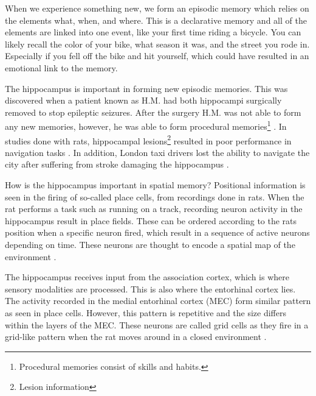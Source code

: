 When we experience something new, we form an episodic memory which relies on the elements what, when, and where. This is a declarative memory and all of the elements are linked into one event, like your first time riding a bicycle. You can likely recall the color of your bike, what season it was, and the street you rode in. Especially if you fell off the bike and hit yourself, which could have resulted in an emotional link to the memory.

The hippocampus is important in forming new episodic memories. This was discovered when a patient known as H.M. had both hippocampi surgically removed to stop epileptic seizures. After the surgery H.M. was not able to form any new memories, however, he was able to form procedural memories\footnote{Procedural memories consist of skills and habits.} \cite{scoville:1957:loss_recent}. In studies done with rats, hippocampal lesions\footnote{Lesion information} resulted in poor performance in navigation tasks \cite{kaada:1961:maze, schlesiger:2013:hippocampal_activation_maze}. In addition, London taxi drivers lost the ability to navigate the city after suffering from stroke damaging the hippocampus \cite{maguire:2000:navigation}.

How is the hippocampus important in spatial memory? Positional information is seen in the firing of so-called place cells, from recordings done in rats. When the rat performs a task such as running on a track, recording neuron activity in the hippocampus result in place fields. These can be ordered according to the rats position when a specific neuron fired, which result in a sequence of active neurons depending on time. These neurons are thought to encode a spatial map of the environment \cite{okeefe:1978:hippocampus}. 

The hippocampus receives input from the association cortex, which is where sensory modalities are processed. This is also where the entorhinal cortex lies. The activity recorded in the medial entorhinal cortex (MEC) form similar pattern as seen in place cells. However, this pattern is repetitive and the size differs within the layers of the MEC. These neurons are called grid cells as they fire in a grid-like pattern when the rat moves around in a closed environment \cite{hafting:2005:microstructure}.

